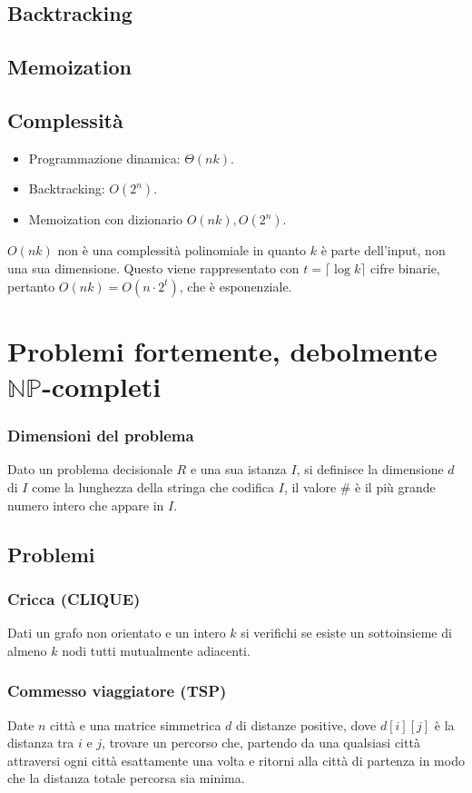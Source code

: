 \subsection{Backtracking}

\subsection{Memoization}

\subsection{Complessit\`a}
\begin{itemize}
	\item Programmazione dinamica: $\Theta(nk)$.
	\item Backtracking: $O(2^n)$.
	\item Memoization con dizionario $O(nk), O(2^n)$.
\end{itemize}
$O(nk)$ non \`e una complessit\`a polinomiale in quanto $k$ \`e parte dell'input, non una sua dimensione. Questo viene rappresentato con $t = \lceil\log k\rceil$ cifre binarie, pertanto
$O(nk) = O(n\cdot 2^t)$, che \`e esponenziale.
\section{Problemi fortemente, debolmente $\mathbf{\mathbb{NP}}$-completi}
\subsubsection{Dimensioni del problema}
Dato un problema decisionale $R$ e una sua istanza $I$, si definisce la dimensione $d$ di $I$ come la lunghezza della stringa che codifica $I$, il valore $\#$ \`e il pi\`u grande numero 
intero che appare in $I$.
\subsection{Problemi}
\subsubsection{Cricca (CLIQUE)}
Dati un grafo non orientato e un intero $k$ si verifichi se esiste un sottoinsieme di almeno $k$ nodi tutti mutualmente adiacenti.
\subsubsection{Commesso viaggiatore (TSP)}
Date $n$ citt\`a e una matrice simmetrica $d$ di distanze positive, dove $d[i][j]$ \`e la distanza tra $i$ e $j$, trovare un percorso che, partendo da una qualsiasi citt\`a
attraversi ogni citt\`a esattamente una volta e ritorni alla citt\`a di partenza in modo che la distanza totale percorsa sia minima.
